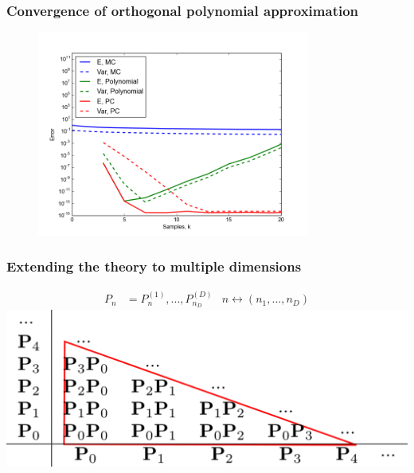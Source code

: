 \documentclass{beamer}
\begin{document}
\begin{frame}
\frametitle{Convergence of orthogonal polynomial approximation}

  \begin{figure}
    \includegraphics[width=0.8\textwidth]{MC_convergence_1D_3.png}
  \end{figure}
   \end{frame}


\begin{frame}
 \frametitle{Extending the theory to multiple dimensions}
 \pause
  \begin{align*}
  P_n &= P^{(1)}_n, ..., P^{(D)}_{n_D}
  & n\longleftrightarrow (n_1, ..., n_D)
  \end{align*}
  \pause
  \includegraphics[width=\textwidth]{multidim.png}
   
 \end{frame}
\end{document}
